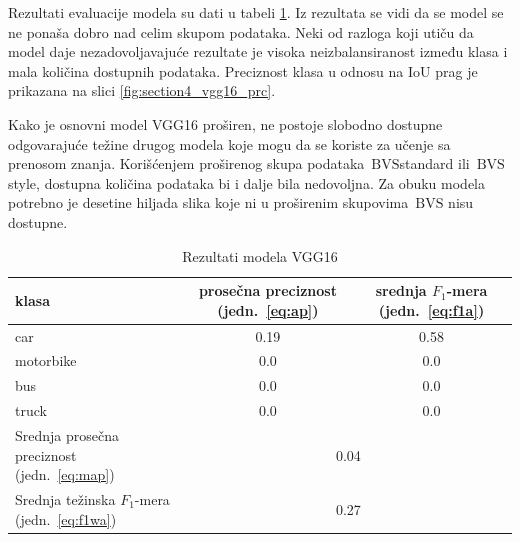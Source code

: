 \documentclass[12pt,oneside]{memoir}
\newcommand{\bvs}{\ensuremath{\,\textrm{BVS}}}
\begin{document}
\clearpage
Rezultati evaluacije modela su dati u tabeli \ref{tab:section4_vgg16_results}. Iz rezultata se vidi da se model se ne ponaša dobro nad celim skupom podataka. Neki od razloga koji utiču da model daje nezadovoljavajuće rezultate je visoka neizbalansiranost između klasa i mala količina dostupnih podataka.
Preciznost klasa u odnosu na IoU prag je prikazana na slici \ref{fig:section4_vgg16_prc}.

Kako je osnovni model VGG16 proširen, ne postoje slobodno dostupne odgovarajuće težine drugog modela koje mogu da se koriste za učenje sa prenosom znanja. 
Korišćenjem proširenog skupa podataka \bvs{standard} ili \bvs{style}, dostupna količina podataka bi i dalje bila nedovoljna. Za obuku modela potrebno je desetine hiljada slika koje ni u proširenim skupovima \bvs{} nisu dostupne. 


\begin{table}[h!]
    \begin{center}
    \caption{Rezultati modela VGG16}
    \begin{tabular}{|m{10em}|c|c|}
        \toprule
        klasa     & prosečna preciznost (jedn.~\ref{eq:ap}) & srednja $F_1$-mera (jedn.~\ref{eq:f1a})  \\ \hline
        \midrule
        car       & 0.19  & 0.58 \\ \hline
        motorbike & 0.0   & 0.0 \\ \hline
        bus       & 0.0   & 0.0 \\ \hline
        truck     & 0.0   & 0.0 \\ \hline
        \bottomrule
        Srednja prosečna preciznost (jedn.~\ref{eq:map}) & \multicolumn{2}{c|}{0.04}  \\ \hline
        Srednja težinska $F_1$-mera (jedn.~\ref{eq:f1wa}) & \multicolumn{2}{c|}{0.27}  \\ \hline
    \end{tabular}
    \label{tab:section4_vgg16_results}
    \end{center}
\end{table}
\end{document}
